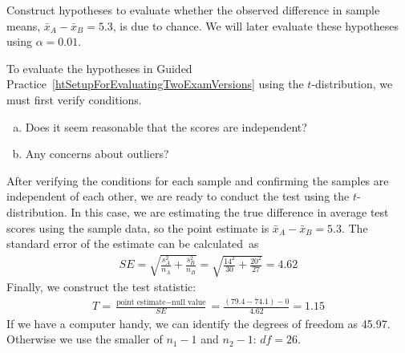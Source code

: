 \begin{exercisewrap}
\begin{nexercise}
\label{htSetupForEvaluatingTwoExamVersions}%
Construct hypotheses to evaluate whether the observed
difference in sample means, $\bar{x}_A - \bar{x}_B=5.3$,
is due to chance. We will later evaluate these hypotheses
using $\alpha = 0.01$.\footnotemark{}
\end{nexercise}
\end{exercisewrap}


\begin{exercisewrap}
\begin{nexercise} \label{conditionsForTDistForEvaluatingTwoExamVersions}%
To evaluate the hypotheses in Guided Practice~\ref{htSetupForEvaluatingTwoExamVersions} using the $t$-distribution, we must first verify conditions.\footnotemark{}
\begin{enumerate}[(a)]
\setlength{\itemsep}{0mm}
\item
    Does it seem reasonable that the scores are independent?
\item
    Any concerns about outliers?
\end{enumerate}
\end{nexercise}
\end{exercisewrap}

After verifying the conditions for each sample and confirming the samples are independent of each other, we are ready to conduct the test using the $t$-distribution. In this case, we are estimating the true difference in average test scores using the sample data, so the point estimate is $\bar{x}_A - \bar{x}_B = 5.3$. The standard error of the estimate can be calculated~as
\begin{align*}
SE
  = \sqrt{\frac{s_A^2}{n_A} + \frac{s_B^2}{n_B}}
  = \sqrt{\frac{14^2}{30} + \frac{20^2}{27}}
  = 4.62
\end{align*}
Finally, we construct the test statistic:
\begin{align*}
T
  = \frac{\text{point estimate} - \text{null value}}{SE}
  = \frac{(79.4-74.1) - 0}{4.62}
  = 1.15
\end{align*}
If we have a computer handy, we can identify the degrees
of freedom as 45.97.
Otherwise we use the smaller of $n_1-1$ and $n_2-1$: $df=26$. 

